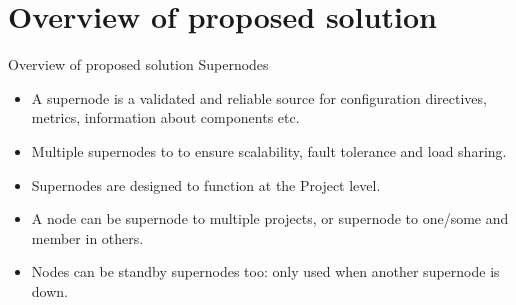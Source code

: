 \documentclass{beamer}
\begin{document}
\section{Overview of proposed solution}
\begin{frame}{Overview of proposed solution}
Supernodes
\begin{itemize}
\item A supernode is a validated and reliable source for configuration directives, metrics, information about components etc.
\item Multiple supernodes to to ensure scalability, fault tolerance and load sharing.
\item Supernodes are designed to function at the Project level.
\item A node can be supernode to multiple projects, or supernode to one/some and member in others.
\item Nodes can be standby supernodes too: only used when another supernode is down.
\end{itemize}
\end{frame}

\end{document}
